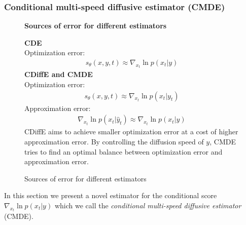 


\subsubsection{Conditional multi-speed diffusive estimator (CMDE)}
\label{ch2:sec:CMDE}
\begin{figure}
\begin{mdframed}
    \begin{center}
       \textbf{Sources of error for different estimators}
    \end{center}
    \textbf{CDE}\\
    Optimization error:
    \begin{gather*}
    s_\theta(x,y,t) \approx \nabla_{x_t}\ln p(x_t|y)   
    \end{gather*}
    \textbf{CDiffE and CMDE}\\
    Optimization error:
    \begin{gather*}
        s_\theta(x,y,t) \approx \nabla_{x_t}\ln p(x_t|y_t)   
        \end{gather*}
    Approximation error:
    \begin{gather*}
        \nabla_{x_t}\ln p(x_t|\hat{y}_t) \approx \nabla_{x_t}\ln p(x_t|y)   
        \end{gather*}
    CDiffE aims to achieve smaller optimization error at a cost of higher approximation error. By controlling the diffusion speed of $y$, CMDE tries to find an optimal balance between optimization error and approximation error.
\end{mdframed}
\caption{Sources of error for different estimators}
\label{ch2:fig:box}
\end{figure}
In this section we present a novel estimator for the conditional score $\nabla_{x_t} \ln p(x_t | y)$ which we call the \textit{conditional multi-speed diffusive estimator} (CMDE). 

